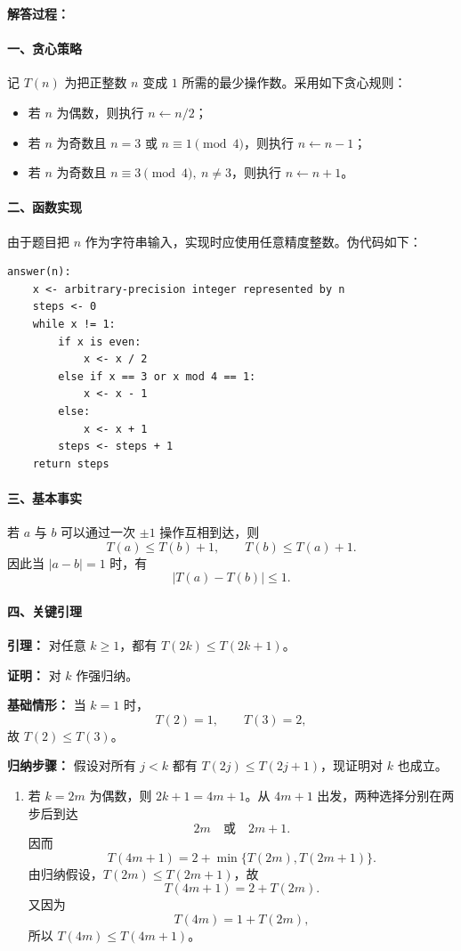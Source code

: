 \documentclass[12pt,a4paper]{article}
\begin{document}
\begin{answerbox}
\textbf{解答过程：}

\paragraph{一、贪心策略}
记 $T(n)$ 为把正整数 $n$ 变成 $1$ 所需的最少操作数。采用如下贪心规则：
\begin{itemize}[leftmargin=2em]
    \item 若 $n$ 为偶数，则执行 $n \gets n/2$；
    \item 若 $n$ 为奇数且 $n=3$ 或 $n \equiv 1 \pmod 4$，则执行 $n \gets n-1$；
    \item 若 $n$ 为奇数且 $n \equiv 3 \pmod 4,\ n\neq 3$，则执行 $n \gets n+1$。
\end{itemize}

\paragraph{二、函数实现}
由于题目把 $n$ 作为字符串输入，实现时应使用任意精度整数。伪代码如下：
\begin{Verbatim}[fontsize=\small]
answer(n):
    x <- arbitrary-precision integer represented by n
    steps <- 0
    while x != 1:
        if x is even:
            x <- x / 2
        else if x == 3 or x mod 4 == 1:
            x <- x - 1
        else:
            x <- x + 1
        steps <- steps + 1
    return steps
\end{Verbatim}

\paragraph{三、基本事实}
若 $a$ 与 $b$ 可以通过一次 $\pm 1$ 操作互相到达，则
\[
T(a) \le T(b)+1,\qquad T(b) \le T(a)+1.
\]
因此当 $|a-b|=1$ 时，有
\[
|T(a)-T(b)| \le 1.
\]

\paragraph{四、关键引理}
\textbf{引理：} 对任意 $k\ge 1$，都有 $T(2k)\le T(2k+1)$。

\textbf{证明：} 对 $k$ 作强归纳。

\textbf{基础情形：} 当 $k=1$ 时，
\[
T(2)=1,\qquad T(3)=2,
\]
故 $T(2)\le T(3)$。

\textbf{归纳步骤：} 假设对所有 $j<k$ 都有 $T(2j)\le T(2j+1)$，现证明对 $k$ 也成立。

\begin{enumerate}[leftmargin=2.5em]
    \item 若 $k=2m$ 为偶数，则 $2k+1=4m+1$。从 $4m+1$ 出发，两种选择分别在两步后到达
    \[
    2m \quad \text{或} \quad 2m+1.
    \]
    因而
    \[
    T(4m+1)=2+\min\{T(2m),T(2m+1)\}.
    \]
    由归纳假设，$T(2m)\le T(2m+1)$，故
    \[
    T(4m+1)=2+T(2m).
    \]
    又因为
    \[
    T(4m)=1+T(2m),
    \]
    所以 $T(4m)\le T(4m+1)$。


\end{enumerate}
\end{answerbox}
\end{document}
